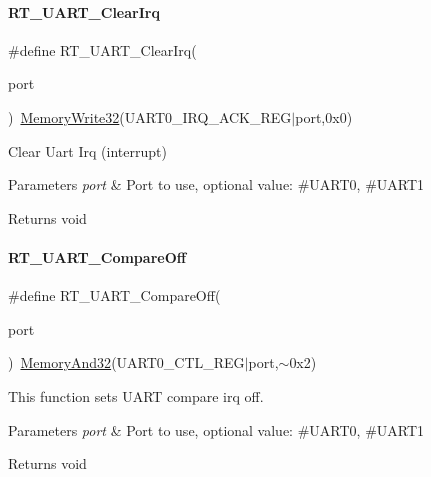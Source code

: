 \paragraph{\texorpdfstring{R\+T\+\_\+\+U\+A\+R\+T\+\_\+\+Clear\+Irq}{RT\_UART\_ClearIrq}}
{\footnotesize\ttfamily \#define R\+T\+\_\+\+U\+A\+R\+T\+\_\+\+Clear\+Irq(\begin{DoxyParamCaption}\item[{}]{port }\end{DoxyParamCaption})~\mbox{\hyperlink{a00020_ad9953f631a539cfaa35baf94f878b3ec}{Memory\+Write32}}(U\+A\+R\+T0\+\_\+\+I\+R\+Q\+\_\+\+A\+C\+K\+\_\+\+R\+EG$\vert$port,0x0)}



Clear Uart Irq (interrupt) 


\begin{DoxyParams}{Parameters}
{\em port} & Port to use, optional value\+: \#\+U\+A\+R\+T0, \#\+U\+A\+R\+T1 \\
\hline
\end{DoxyParams}
\begin{DoxyReturn}{Returns}
void 
\end{DoxyReturn}
\mbox{\label{a00056_aab59c28b31f6d93c8400c2af10cc0b05}} 
\paragraph{\texorpdfstring{R\+T\+\_\+\+U\+A\+R\+T\+\_\+\+Compare\+Off}{RT\_UART\_CompareOff}}
{\footnotesize\ttfamily \#define R\+T\+\_\+\+U\+A\+R\+T\+\_\+\+Compare\+Off(\begin{DoxyParamCaption}\item[{}]{port }\end{DoxyParamCaption})~\mbox{\hyperlink{a00020_a5c1a2bd4c1bd4c2f429d8042a45327ff}{Memory\+And32}}(U\+A\+R\+T0\+\_\+\+C\+T\+L\+\_\+\+R\+EG$\vert$port,$\sim$0x2)}



This function sets U\+A\+RT compare irq off. 


\begin{DoxyParams}{Parameters}
{\em port} & Port to use, optional value\+: \#\+U\+A\+R\+T0, \#\+U\+A\+R\+T1 \\
\hline
\end{DoxyParams}
\begin{DoxyReturn}{Returns}
void 
\end{DoxyReturn}
\mbox{\label{a00056_aab5e3da11e9f9d531cab23aa451d2356}} 
